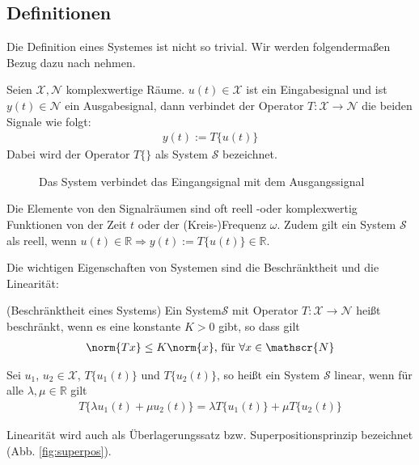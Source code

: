 \subsection{Definitionen} \label{sys:defi}
Die Definition eines Systemes ist nicht so trivial. Wir werden folgendermaßen Bezug dazu nach \cite{Dambrowski2013} nehmen.
\begin{defi}
	Seien $\mathscr{X}, \mathscr{N}$ komplexwertige Räume. $u(t) \in \mathscr{X}$ ist ein Eingabesignal und ist $y(t) \in \mathscr{N}$ ein Ausgabesignal, dann verbindet der Operator $T: \mathscr{X} \rightarrow \mathscr{N}$  die beiden Signale wie folgt:
	\begin{align}
		y(t) := T\{u(t)\}	
	\end{align}
	Dabei wird der Operator $T\{\}$ als System $\mathscr{S}$ bezeichnet. 
\end{defi}
\begin{figure}[h]
	\centering
	\def\svgwidth{0.75\columnwidth}
	
	\caption{Das System verbindet das Eingangsignal mit dem Ausgangssignal}
	\label{fig:io}
\end{figure}
\begin{bem}
Die Elemente von den Signalräumen sind oft reell -oder komplexwertig Funktionen von der Zeit $t$ oder der (Kreis-)Frequenz $\omega$. Zudem gilt ein System $\mathscr{S}$ als reell, wenn $u(t) \in \mathbb{R} \Rightarrow y(t):= T\{u(t)\} \in \mathbb{R}$.  
\end{bem}
Die wichtigen Eigenschaften von Systemen sind die Beschränktheit und die Linearität:
\begin{defi}(Beschränktheit eines Systems) Ein System$\mathscr{S}$ mit Operator $T: \mathscr{X} \rightarrow \mathscr{N}$ heißt beschränkt, wenn es eine konstante $K > 0$ gibt, so dass gilt 
\begin{align}
 \norm{Tx} \leq K \norm{x} \text{, für } \forall x \in \mathscr{N}
\end{align}
\end{defi}
\cite{Dambrowski2000}
\begin{defi}
Sei $u_1$, $u_2 \in \mathscr{X}$, $T\{u_1(t)\}$ und $T\{u_2(t)\}$, so heißt ein System $\mathscr{S}$ linear, wenn für alle $\lambda, \mu \in \mathbb{R}$ gilt
\begin{align}
	T \{ \lambda u_1(t) + \mu u_2(t) \} = \lambda T \{ u_1(t) \} + \mu T \{ u_2(t) \}
\end{align}
\end{defi}
Linearität wird auch als Überlagerungssatz bzw. Superpositionsprinzip bezeichnet (Abb. \ref{fig:superpos}).
